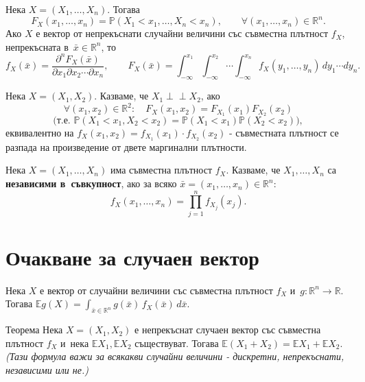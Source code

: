 \begin{defbox}
Нека $X=(X_1,\dots,X_n)$. Тогава
\[
  F_X(x_1,\dots,x_n) = \mathbb P(X_1<x_1,\dots,X_n<x_n), \qquad \forall(x_1,\dots,x_n)\in\mathbb R^n.
\]
Ако $X$ е вектор от непрекъснати случайни величини със съвместна
плътност $f_X$, непрекъсната в~$\bar x\in\mathbb R^n$, то
\[
  f_X(\bar x) = \frac{\partial^n F_X(\bar x)}{\partial x_1\partial x_2\cdots\partial x_n}, \qquad
  F_X(\bar x) = \int_{-\infty}^{x_1}\!\!\int_{-\infty}^{x_2}\!\!\cdots\!\!\int_{-\infty}^{x_n} f_X(y_1,\dots,y_n)\,dy_1\cdots dy_n.
\]
\end{defbox}

\begin{defbox}[~(Независимост)]
Нека $X=(X_1,X_2)$. Казваме, че $X_1\perp\!\!\!\perp X_2$, ако
\[
  \forall(x_1,x_2)\in\mathbb R^2:\quad F_X(x_1,x_2) = F_{X_1}(x_1)F_{X_2}(x_2)
\]
\[
  \big(\text{т.е.\ } \mathbb P(X_1<x_1,X_2<x_2)=\mathbb P(X_1<x_1)\mathbb P(X_2<x_2)\big),
\]
еквивалентно на $f_X(x_1,x_2) = f_{X_1}(x_1)\cdot f_{X_2}(x_2)$ -
съвместната плътност се разпада на произведение от двете маргинални
плътности.
\end{defbox}

\begin{defbox}
Нека $X=(X_1,\dots,X_n)$ има съвместна плътност $f_X$. Казваме, че
$X_1,\dots,X_n$ са \textbf{независими в~съвкупност}, ако за всяко
$\bar x=(x_1,\dots,x_n)\in\mathbb R^n$:
\[
  f_X(x_1,\dots,x_n) = \prod_{j=1}^{n} f_{X_j}(x_j).
\]
\end{defbox}

\section{Очакване за случаен вектор}

\begin{rembox}
Нека $X$ е вектор от случайни величини със съвместна плътност $f_X$ и~$g:\mathbb R^n\to\mathbb R$. Тогава
$\displaystyle \mathbb Eg(X) = \int_{\bar x\in\mathbb R^n} g(\bar x)\,f_X(\bar x)\,d\bar x$.
\end{rembox}

\begin{thmbox}[]{Теорема}
Нека $X=(X_1,X_2)$ е непрекъснат случаен вектор със съвместна
плътност $f_X$ и~нека $\mathbb EX_1,\mathbb EX_2$ съществуват.
Тогава $\mathbb E(X_1+X_2) = \mathbb EX_1+\mathbb EX_2$. \emph{(Тази
формула важи за всякакви случайни величини - дискретни, непрекъснати,
независими или не.)}
\end{thmbox}

